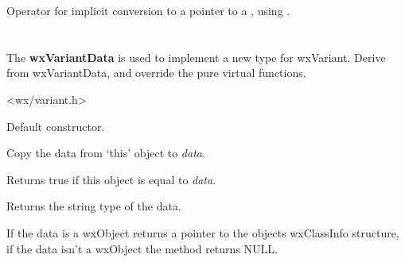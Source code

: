 \label{wxvariantdatetime}


Operator for implicit conversion to a pointer to a , using .

\section{}\label{wxvariantdata}

The {\bf wxVariantData} is used to implement a new type for wxVariant. Derive from wxVariantData,
and override the pure virtual functions.




<wx/variant.h>




\label{wxvariantdatactor}


Default constructor.

\label{wxvariantdatacopy}


Copy the data from `this' object to {\it data}.

\label{wxvariantdataeq}


Returns true if this object is equal to {\it data}.

\label{wxvariantdatagettype}


Returns the string type of the data.

\label{wxvariantdatagetvalueclassinfo}


If the data is a wxObject returns a pointer to the objects wxClassInfo structure, if
the data isn't a wxObject the method returns NULL.

